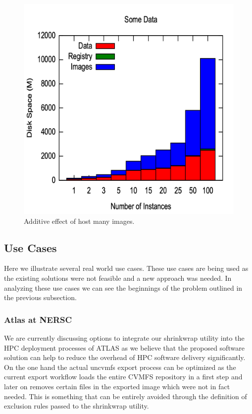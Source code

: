 \documentclass[conference]{IEEEtran}
\begin{document}
\begin{figure}[h]
\includegraphics[width=\columnwidth]{plots/specification_size.png}
\caption{Additive effect of host many images.}
\label{figure:spec-size}
\end{figure}

\subsection{Use Cases}
Here we illustrate several real world use cases.
These use cases are being used as the existing solutions
were not feasible and a new approach was needed.
In analyzing these use cases we can see the beginnings of
the problem outlined in the previous subsection.

\subsubsection{Atlas at NERSC}

We are currently discussing options to integrate our shrinkwrap utility into the HPC deployment processes of ATLAS as we believe that the proposed software solution can help to reduce the overhead of HPC software delivery significantly. On the one hand the actual uncvmfs export process can be optimized as the current export workflow loads the entire CVMFS repository in a first step and later on removes certain files in the exported image which were not in fact needed. This is something that can be entirely avoided through the definition of exclusion rules passed to the shrinkwrap utility.
\end{document}
